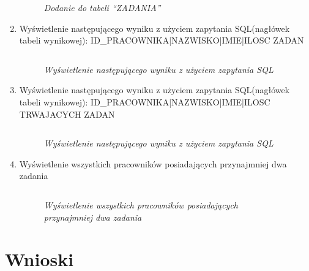 \documentclass{article}
\begin{document}
\begin{enumerate}
\begin{figure}[H]
	\centering
	\caption{\textit{Dodanie do tabeli ``ZADANIA''}}
\end{figure}

\item Wyświetlenie następującego wyniku z użyciem zapytania SQL(nagłówek tabeli wynikowej): ID\_PRACOWNIKA|NAZWISKO|IMIE|ILOSC ZADAN

\begin{lstlisting}[style=SQL, caption=\textit{Wyświetlenie następującego wyniku z użyciem zapytania SQL}]
\end{lstlisting}

\begin{figure}[H]
	\centering
	\caption{\textit{Wyświetlenie następującego wyniku z użyciem zapytania SQL}}
\end{figure}

\item Wyświetlenie następującego wyniku z użyciem zapytania SQL(nagłówek tabeli wynikowej): ID\_PRACOWNIKA|NAZWISKO|IMIE|ILOSC TRWAJACYCH ZADAN

\begin{lstlisting}[style=SQL, caption=\textit{Wyświetlenie następującego wyniku z użyciem zapytania SQL}]
\end{lstlisting}

\begin{figure}[H]
	\centering
	\caption{\textit{Wyświetlenie następującego wyniku z użyciem zapytania SQL}}
\end{figure}

\item Wyświetlenie wszystkich pracowników posiadających przynajmniej dwa zadania

\begin{lstlisting}[style=SQL, caption=\textit{Wyświetlenie wszystkich pracowników posiadających przynajmniej dwa zadania}]
\end{lstlisting}

\begin{figure}[H]
	\centering
	\caption{\textit{Wyświetlenie wszystkich pracowników posiadających przynajmniej dwa zadania}}
\end{figure}


\end{enumerate}
\section{Wnioski}
\end{document}
